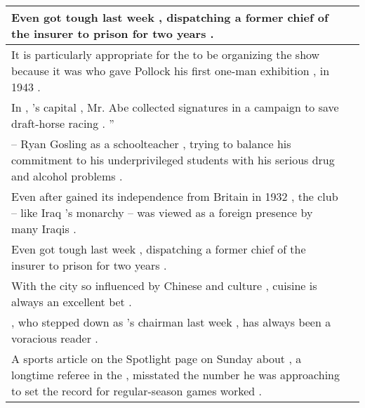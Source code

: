 \begin{table}
\begin{tabular}{p{} P{1,4cm} }
\hline
{} {Even \underline{} got tough last week , dispatching a former chief of the insurer \underline{} to prison for two years .} &    \\ 
\hline
{} {It is particularly appropriate for the \underline{} to be organizing the show because it was \underline{} who gave Pollock his first one-man exhibition , in 1943 .} &    \\ 
\hline
{} {In \underline{} , \underline{} 's capital , Mr. Abe collected signatures in a campaign to save draft-horse racing . ''} &    \\ 
\hline
{} {\underline{} -- Ryan Gosling as a \underline{} schoolteacher , trying to balance his commitment to his underprivileged students with his serious drug and alcohol problems .} &    \\ 
\hline
{} {Even after \underline{} gained its independence from Britain in 1932 , the club -- like Iraq 's \underline{} monarchy -- was viewed as a foreign presence by many Iraqis .} &    \\ 
\hline
{} {Even \underline{} got tough last week , dispatching a former chief of the insurer \underline{} to prison for two years .} &    \\ 
\hline
{} {With the city so influenced by Chinese and \underline{} culture , \underline{} cuisine is always an excellent bet .} &    \\ 
\hline
{} {\underline{} , who stepped down as \underline{} 's chairman last week , has always been a voracious reader .} &    \\ 
\hline
{} {A sports article on the Spotlight page on Sunday about \underline{} , a longtime referee in the \underline{} , misstated the number he was approaching to set the record for regular-season games worked .} &    \\ 

\end{tabular}
\end{table}
